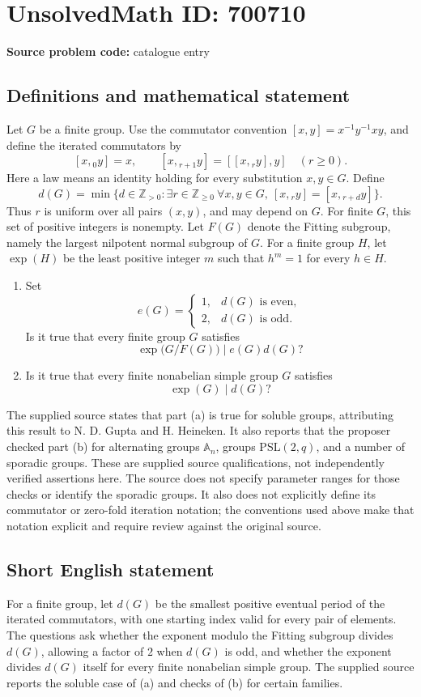 \documentclass[11pt]{article}
\newcommand{\Z}{\mathbb{Z}}
\begin{document}
\section*{UnsolvedMath ID: 700710}
\textbf{Source problem code:} catalogue entry
\subsection{Definitions and mathematical statement}
Let \(G\) be a finite group. Use the commutator convention \([x,y]=x^{-1}y^{-1}xy\), and define the iterated commutators by
\[
[x,{}_0y]=x,\qquad [x,{}_{r+1}y]=[[x,{}_ry],y]\quad(r\geq 0).
\]
Here a law means an identity holding for every substitution \(x,y\in G\). Define
\[
d(G)=\min\bigl\{d\in\Z_{>0}:\exists r\in\Z_{\geq0}\ \forall x,y\in G,\ [x,{}_ry]=[x,{}_{r+d}y]\bigr\}.
\]
Thus \(r\) is uniform over all pairs \((x,y)\), and may depend on \(G\). For finite \(G\), this set of positive integers is nonempty. Let \(F(G)\) denote the Fitting subgroup, namely the largest nilpotent normal subgroup of \(G\). For a finite group \(H\), let \(\exp(H)\) be the least positive integer \(m\) such that \(h^m=1\) for every \(h\in H\).

\begin{enumerate}
\item[(a)] Set
\[
e(G)=\begin{cases}1,&d(G)\text{ is even},\\2,&d(G)\text{ is odd}.\end{cases}
\]
Is it true that every finite group \(G\) satisfies
\[
\exp\bigl(G/F(G)\bigr)\mid e(G)d(G)?
\]
\item[(b)] Is it true that every finite nonabelian simple group \(G\) satisfies
\[
\exp(G)\mid d(G)?
\]
\end{enumerate}
The supplied source states that part (a) is true for soluble groups, attributing this result to N. D. Gupta and H. Heineken. It also reports that the proposer checked part (b) for alternating groups \(\mathbb A_n\), groups \(\mathrm{PSL}(2,q)\), and a number of sporadic groups. These are supplied source qualifications, not independently verified assertions here. The source does not specify parameter ranges for those checks or identify the sporadic groups. It also does not explicitly define its commutator or zero-fold iteration notation; the conventions used above make that notation explicit and require review against the original source.
\subsection{Short English statement}
For a finite group, let \(d(G)\) be the smallest positive eventual period of the iterated commutators, with one starting index valid for every pair of elements. The questions ask whether the exponent modulo the Fitting subgroup divides \(d(G)\), allowing a factor of \(2\) when \(d(G)\) is odd, and whether the exponent divides \(d(G)\) itself for every finite nonabelian simple group. The supplied source reports the soluble case of (a) and checks of (b) for certain families.
\end{document}
